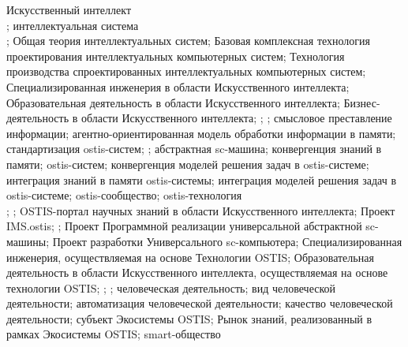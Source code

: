 {Искусственный интеллект\\
;
интеллектуальная система\\
;
Общая теория интеллектуальных систем;
Базовая комплексная технология проектирования интеллектуальных компьютерных систем;
Технология производства спроектированных интеллектуальных компьютерных систем;
Специализированная инженерия в области Искусственного интеллекта;
Образовательная деятельность в области Искусственного интеллекта;
Бизнес-деятельность в области Искусственного интеллекта\bigskip;
;
;
смысловое преставление информации;
агентно-ориентированная модель обработки информации в памяти; стандартизация ostis-систем;
;
абстрактная sc-машина;
конвергенция знаний в памяти;
ostis-систем;
конвергенция моделей решения задач в  ostis-системе;
интеграция знаний в памяти  ostis-системы;
интеграция моделей решения задач в  ostis-системе;
ostis-сообщество;
ostis-технология\\
;
\bigskip;
OSTIS-портал научных знаний в области Искусственного интеллекта;
Проект IMS.ostis;
;
Проект Программной реализации универсальной абстрактной sc-машины;
Проект разработки Универсального sc-компьютера;
Специализированная инженерия, осуществляемая на основе Технологии OSTIS;
Образовательная деятельность в области Искусственного интеллекта, осуществляемая на основе технологии OSTIS;
\bigskip;
;
человеческая деятельность;
вид человеческой деятельности;
автоматизация человеческой деятельности;
качество человеческой деятельности;
субъект Экосистемы OSTIS;
Рынок знаний, реализованный в рамках Экосистемы OSTIS;
smart-общество}

\scnendstruct
